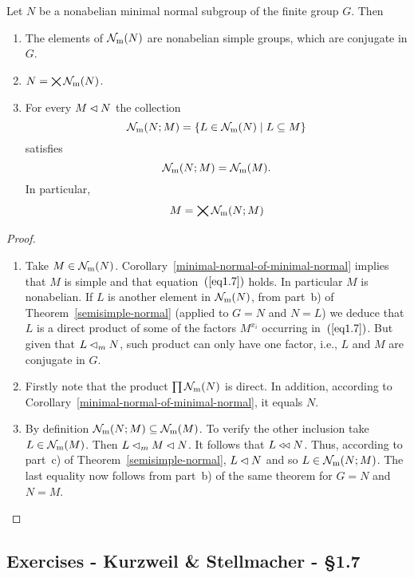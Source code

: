 \begin{cor}
    Let\/ $N$ be a nonabelian minimal normal subgroup of the finite group\/ $G$.  Then
    \begin{enumerate}[\rm a)]
        \item The elements of\/ $\operatorname{{\cal N}_m}(N)$ are nonabelian simple groups, which are conjugate in\/ $G$.
        \item $N = \bigtimes\operatorname{{\cal N}_m}(N)$.
        \item For every\/ $M\lhd N$ the collection
        $$
            \operatorname{{\cal N}_m}(N;M)=\{L\in\operatorname{{\cal N}_m}(N)\mid L\subseteq M\}
        $$
        satisfies
        $$
            \operatorname{{\cal N}_m}(N;M) = \operatorname{{\cal N}_m}(M).
        $$
        In particular,
        $$
            M = \bigtimes\operatorname{{\cal N}_m}(N;M)
        $$
    \end{enumerate}
\end{cor}

\begin{proof}${}$
\begin{enumerate}[\rm a)]
    \item Take $M\in\operatorname{{\cal N}_m}(N)$. Corollary~\ref{minimal-normal-of-minimal-normal} implies that $M$ is simple and that equation~$(\ref{eq1.7})$ holds. In particular $M$ is nonabelian. If $L$ is another element in $\operatorname{{\cal N}_m}(N)$, from part~b) of Theorem~\ref{semisimple-normal} (applied to $G=N$ and $N=L$) we deduce that $L$ is a direct product of some of the factors $M^{x_i}$ occurring in~$(\ref{eq1.7})$. But given that $L\lhd_mN$, such product can only have one factor, i.e., $L$ and $M$ are conjugate in $G$.

    \item Firstly note that the product $\prod\operatorname{{\cal N}_m}(N)$ is direct. In addition, according to Corollary~\ref{minimal-normal-of-minimal-normal}, it equals $N$.

    \item By definition $\operatorname{{\cal N}_m}(N;M)\subseteq\operatorname{{\cal N}_m}(M)$. To verify the other inclusion take $L\in\operatorname{{\cal N}_m}(M)$. Then $L\lhd_m M\lhd N$. It follows that $L\mathrel{\triangleleft\triangleleft} N$. Thus, according to part~c) of Theorem~\ref{semisimple-normal}, $L\lhd N$ and so $L\in\operatorname{{\cal N}_m}(N;M)$. The last equality now follows from part~b) of the same theorem for $G=N$ and $N=M$.
\end{enumerate}
\end{proof}

\subsection{Exercises - Kurzweil \& Stellmacher - \S 1.7}

